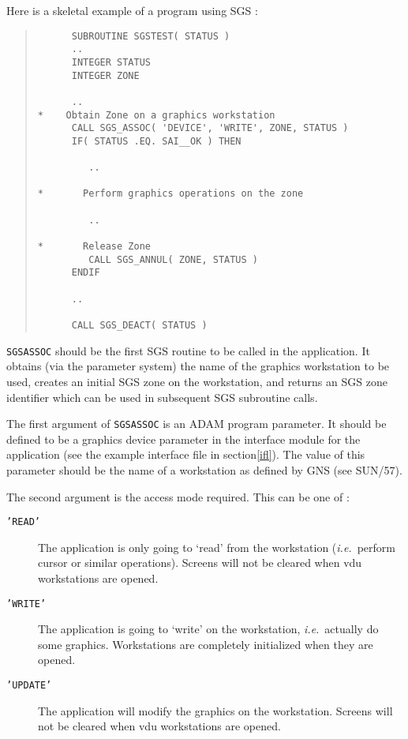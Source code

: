 \documentclass[twoside,11pt]{article}
\newcommand{\hyperref}[4]{#2\ref{#4}#3}
\newcommand{\htmlref}[2]{#1}
\newcommand{\xref}[3]{#1}
\renewcommand{\_}{\texttt{\symbol{95}}}
\begin{document}
Here is a skeletal example of a program using SGS :
\begin{quote}
\begin{verbatim}
      SUBROUTINE SGSTEST( STATUS )
      ..
      INTEGER STATUS
      INTEGER ZONE

      ..
*    Obtain Zone on a graphics workstation
      CALL SGS_ASSOC( 'DEVICE', 'WRITE', ZONE, STATUS )
      IF( STATUS .EQ. SAI__OK ) THEN

         ..

*       Perform graphics operations on the zone

         ..

*       Release Zone
         CALL SGS_ANNUL( ZONE, STATUS )
      ENDIF

      ..

      CALL SGS_DEACT( STATUS )

\end{verbatim}
\end{quote}

\htmlref{{\tt SGS\_ASSOC}}{SGS_ASSOC}
should be the first SGS routine to be called in the application.
It obtains (via the parameter system) the name of the graphics workstation 
to be used, creates an initial SGS zone on the workstation, and returns an
SGS zone identifier which can be used in subsequent SGS subroutine calls.

The first argument of {\tt SGS\_ASSOC} is an ADAM program parameter. 
It should be
defined to be a graphics device parameter in the interface module for the
application (see the 
\hyperref{example interface file}{example interface file 
in section}{}{ifl}). The value of
this parameter should be the name of a workstation as defined by GNS (see
\xref{SUN/57}{sun57}{GKSWorkstationNames}).

The second argument is the access mode required. This can be one of :
\begin{description}
\item[{\tt 'READ'}] The application is only going to `read' from the workstation
({\em i.e.}\ perform cursor or similar operations). 
Screens will not be cleared when vdu workstations are opened.
\item[{\tt 'WRITE'}] The application is going to `write' on the workstation,
{\em i.e.}\ actually do some graphics. 
Workstations are completely initialized when they are opened.
\item[{\tt 'UPDATE'}] The application will modify the graphics on the 
workstation.
Screens will not be cleared when vdu workstations are opened.
\end{description}
\end{document}
